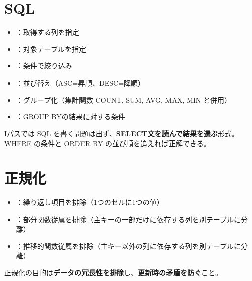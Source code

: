 \begin{hikaku}[主キーと外部キー]
\end{hikaku}

\section{SQL}

\begin{teigi}[SQLの基本構文]
\begin{itemize}
  \item {}：取得する列を指定
  \item {}：対象テーブルを指定
  \item {}：条件で絞り込み
  \item {}：並び替え（ASC=昇順、DESC=降順）
  \item {}：グループ化（集計関数 COUNT, SUM, AVG, MAX, MIN と併用）
  \item {}：GROUP BYの結果に対する条件
\end{itemize}
\end{teigi}

\begin{advice}
Iパスでは SQL を書く問題は出ず、\textbf{SELECT文を読んで結果を選ぶ}形式。
WHERE の条件と ORDER BY の並び順を追えれば正解できる。
\end{advice}

\section{正規化}

\begin{teigi}[正規化の3段階]
\begin{itemize}
  \item {}：繰り返し項目を排除（1つのセルに1つの値）
  \item {}：部分関数従属を排除（主キーの一部だけに依存する列を別テーブルに分離）
  \item {}：推移的関数従属を排除（主キー以外の列に依存する列を別テーブルに分離）
\end{itemize}
正規化の目的は\textbf{データの冗長性を排除}し、\textbf{更新時の矛盾を防ぐ}こと。
\end{teigi}

